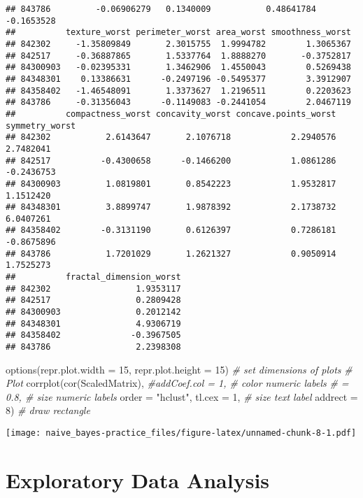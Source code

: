 \documentclass[
]{article}
\newenvironment{Shaded}{\begin{snugshade}}{\end{snugshade}}
\newcommand{\AttributeTok}[1]{\textcolor[rgb]{0.77,0.63,0.00}{#1}}
\newcommand{\CommentTok}[1]{\textcolor[rgb]{0.56,0.35,0.01}{\textit{#1}}}
\newcommand{\DecValTok}[1]{\textcolor[rgb]{0.00,0.00,0.81}{#1}}
\newcommand{\FunctionTok}[1]{\textcolor[rgb]{0.00,0.00,0.00}{#1}}
\newcommand{\NormalTok}[1]{#1}
\newcommand{\StringTok}[1]{\textcolor[rgb]{0.31,0.60,0.02}{#1}}
\begin{document}
\begin{verbatim}
## 843786         -0.06906279   0.1340009           0.48641784   -0.1653528
##          texture_worst perimeter_worst area_worst smoothness_worst
## 842302     -1.35809849       2.3015755  1.9994782        1.3065367
## 842517     -0.36887865       1.5337764  1.8888270       -0.3752817
## 84300903   -0.02395331       1.3462906  1.4550043        0.5269438
## 84348301    0.13386631      -0.2497196 -0.5495377        3.3912907
## 84358402   -1.46548091       1.3373627  1.2196511        0.2203623
## 843786     -0.31356043      -0.1149083 -0.2441054        2.0467119
##          compactness_worst concavity_worst concave.points_worst symmetry_worst
## 842302           2.6143647       2.1076718            2.2940576      2.7482041
## 842517          -0.4300658      -0.1466200            1.0861286     -0.2436753
## 84300903         1.0819801       0.8542223            1.9532817      1.1512420
## 84348301         3.8899747       1.9878392            2.1738732      6.0407261
## 84358402        -0.3131190       0.6126397            0.7286181     -0.8675896
## 843786           1.7201029       1.2621327            0.9050914      1.7525273
##          fractal_dimension_worst
## 842302                 1.9353117
## 842517                 0.2809428
## 84300903               0.2012142
## 84348301               4.9306719
## 84358402              -0.3967505
## 843786                 2.2398308
\end{verbatim}

\begin{Shaded}
\begin{Highlighting}[]
\FunctionTok{options}\NormalTok{(}\AttributeTok{repr.plot.width =} \DecValTok{15}\NormalTok{, }\AttributeTok{repr.plot.height =} \DecValTok{15}\NormalTok{) }\CommentTok{\# set dimensions of plots}
\CommentTok{\# Plot}
\FunctionTok{corrplot}\NormalTok{(}\FunctionTok{cor}\NormalTok{(ScaledMatrix),}
         \CommentTok{\#addCoef.col = 1,    \# color numeric labels}
         \CommentTok{\# = 0.8, \# size numeric labels}
         \AttributeTok{order =} \StringTok{"hclust"}\NormalTok{,}
         \AttributeTok{tl.cex =} \DecValTok{1}\NormalTok{, }\CommentTok{\# size text label}
         \AttributeTok{addrect =} \DecValTok{8}\NormalTok{) }\CommentTok{\# draw rectangle}
\end{Highlighting}
\end{Shaded}

\texttt{[image: naive\_bayes-practice\_files/figure-latex/unnamed-chunk-8-1.pdf]}

\hypertarget{exploratory-data-analysis}{%
\section{Exploratory Data Analysis}\label{exploratory-data-analysis}}
\end{document}
